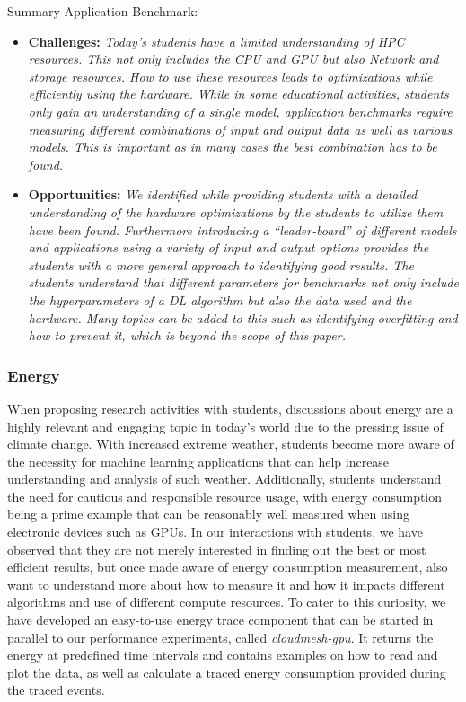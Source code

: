 \begin{tcolorbox}
Summary Application Benchmark:

\begin{itemize}
\item {\bf Challenges:} {\it Today's students have a limited understanding of HPC resources. This not only includes the CPU and GPU but also Network and storage resources. How to use these resources leads to optimizations while efficiently using the hardware. While in some educational activities, students only gain an understanding of a single model, application benchmarks require measuring different combinations of input and output data as well as various models. This is important as in many cases the best combination has to be found. }
\item {\bf Opportunities:} {\it We identified while providing students with a detailed understanding of the hardware optimizations by the students to utilize them have been found. Furthermore introducing a ``leader-board'' of different models and applications using a variety of input and output options provides the students with a more general approach to identifying good results. The students understand that different parameters for benchmarks not only include the hyperparameters of a DL algorithm but also the data used and the hardware. Many topics can be added to this such as identifying overfitting and how to prevent it, which is beyond the scope of this paper.}
\end{itemize}
\end{tcolorbox}



\subsubsection{Energy}
\label{sec:perf-energy}


When proposing research activities with students, discussions about energy are a highly relevant and engaging topic in today's world due to the pressing issue of climate change. With increased extreme weather, students become more aware of the necessity for machine learning applications that can help increase understanding and analysis of such weather. Additionally, students understand the need for cautious and responsible resource usage, with energy consumption being a prime example that can be reasonably well measured when using electronic devices such as GPUs.
In our interactions with students, we have observed that they are not merely interested in finding out the best or most efficient results, but once made aware of energy consumption measurement, also want to understand more about how to measure it and how it impacts different algorithms and use of different compute resources.
To cater to this curiosity, we have developed an easy-to-use energy trace component that can be started in parallel to our performance experiments, called {\em cloudmesh-gpu}. It returns the energy at predefined time intervals and contains examples on how to read and plot the data, as well as calculate a traced energy consumption provided during the traced events.


